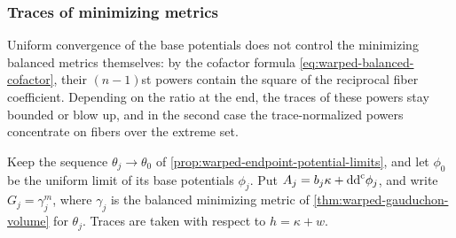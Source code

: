 \subsubsection{Traces of minimizing metrics}
\label{sec:warped-minimizer-trace-limits}

Uniform convergence of the base potentials does not control the minimizing balanced metrics themselves: by the cofactor formula \eqref{eq:warped-balanced-cofactor}, their $(n-1)$st powers contain the square of the reciprocal fiber coefficient. Depending on the ratio at the end, the traces of these powers stay bounded or blow up, and in the second case the trace-normalized powers concentrate on fibers over the extreme set.

Keep the sequence $\theta_j\to\theta_0$ of \cref{prop:warped-endpoint-potential-limits}, and let $\phi_0$ be the uniform limit of its base potentials $\phi_j$. Put $A_j=b_j\kappa+\mathrm{dd}^{\mathrm{c}}\phi_j$, and write $G_j=\gamma_j^m$, where $\gamma_j$ is the balanced minimizing metric of \cref{thm:warped-gauduchon-volume} for $\theta_j$. Traces are taken with respect to $h=\kappa+w$.

